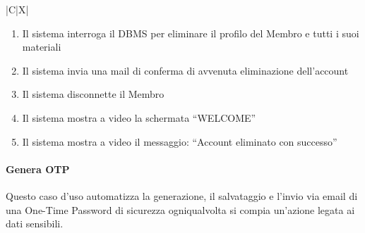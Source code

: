 \begin{tabularx}{\textwidth}{|C|X|}
{\begin{enumerate}
\begin{enumerate}
\begin{enumerate}
            \item \textbf{SE} la password \`e sbagliata:
            \begin{enumerate}
                \item Il sistema mostra a video l'errore: ``Errore: Password Sbagliata''
                \item Il Membro ricompila i campi
                \item Il Membro preme il pulsante ``CONFERMA ELIMINAZIONE''
            \end{enumerate}
        \end{enumerate}
        \item Il sistema controlla i valori inseriti
    \end{enumerate}
    \item Il sistema interroga il DBMS per eliminare il profilo del Membro e tutti i suoi materiali
    \item Il sistema invia una mail di conferma di avvenuta eliminazione dell'account
    \item Il sistema disconnette il Membro
    \item Il sistema mostra a video la schermata ``WELCOME''
    \item Il sistema mostra a video il messaggio: ``Account eliminato con successo''
\end{enumerate}
}
\hline
\end{tabularx}

\clearpage

\paragraph{Genera OTP}
\par{\noindent Questo caso d'uso automatizza la generazione, il salvataggio e l'invio via email di una One-Time Password di sicurezza ogniqualvolta si compia un'azione legata ai dati sensibili.}

